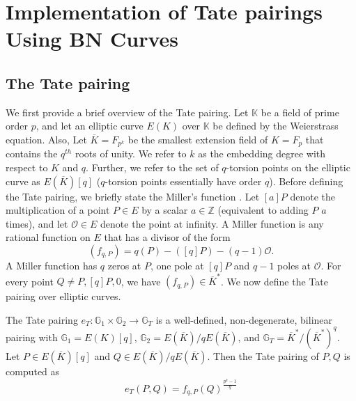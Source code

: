 \section{Implementation of Tate pairings Using BN Curves}
\label{app_sec:implementation}

\subsection{The Tate pairing}

We first provide a brief overview of the Tate pairing. Let $\mathbb{K}$ be a field of prime order $p$, and let an elliptic curve $E(K)$ over $\mathbb{K}$ be defined by the Weierstrass \cite{miller1986use} equation. Also, Let $\overline{K} = F_{p^k}$ be the smallest extension field of $K=F_p$ that contains the $q^{th}$ roots of unity. We refer to $k$ as the embedding degree with respect to $K$ and $q$. Further, we refer to the set of $q$-torsion points on the elliptic curve as $E(\overline{K})[q]$ ($q$-torsion points essentially have order $q$). Before defining the Tate pairing, we briefly state the Miller's function \cite{miller1986use}. Let $[a]P$ denote the multiplication of a point $P \in E$ by a scalar $a \in \mathbb{Z}$ (equivalent to adding $P$ $a$ times), and let $\mathcal{O} \in E$ denote the point at infinity. A Miller function is any rational function on $E$ that has a divisor of the form
  \begin{equation}
   (f_{q,P}) = q(P)-([q]P)-(q-1)\mathcal{O}.
  \end{equation}
A Miller function has $q$ zeros at $P$, one pole at $[q]P$ and $q-1$ poles at $\mathcal{O}$. For every point $Q\neq P, [q]P, \mathcal{0}$, we have $(f_{q,P})\in {\overline{K}}^{*}$. We now define the Tate pairing over elliptic curves. 

The Tate pairing $e_{T}:\mathbb{G}_1\times \mathbb{G}_2\longrightarrow \mathbb{G}_T$ is a well-defined, non-degenerate, bilinear pairing with $\mathbb{G}_1 = E(K)[q]$, $\mathbb{G}_2=E(\overline{K})/qE(\overline{K})$, and $\mathbb{G}_T = {\overline{K}}^*/({\overline{K}}^{*})^q$. Let $P \in E(\overline{K})[q]$ and $Q \in E(\overline{K})/qE(\overline{K})$. Then the Tate pairing of $P,Q$ is computed as 
\begin{equation}
 e_T(P,Q)=f_{q,P}(Q)^{\frac{p^k-1}{q}}
\end{equation}


